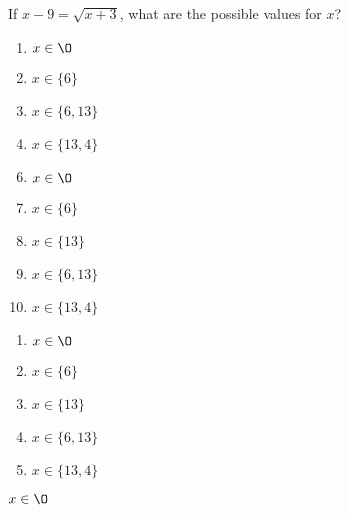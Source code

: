 If $x-9=\sqrt{x+3} $,
what are the possible values for $x$?


\ifsat
	\begin{enumerate}[label=\Alph*)]
		\item $x\in\O  $ %
		\item $x\in\{6\}  $ 
		\item $x\in\{6,13\}  $
		\item $x\in\{13,4 \} $
	\end{enumerate}
\else
\fi

\ifacteven
	\begin{enumerate}[label=\textbf{\Alph*.},itemsep=\fill,align=left]
		\setcounter{enumii}{5}
		\item $x\in\O  $ %
		\item $x\in\{6\}  $ 
		\item $x\in\{13\}  $ 
		\addtocounter{enumii}{1}
		\item $x\in\{6,13\}  $
		\item $x\in\{13,4 \} $
	\end{enumerate}
\else
\fi

\ifactodd
	\begin{enumerate}[label=\textbf{\Alph*.},itemsep=\fill,align=left]
		\item $x\in\O  $ %
		\item $x\in\{6\}  $ 
		\item $x\in\{13\}  $ 
		\item $x\in\{6,13\}  $
		\item $x\in\{13,4 \} $
	\end{enumerate}
\else
\fi

\ifgridin
 $x\in\O  $ %
		
\else
\fi

